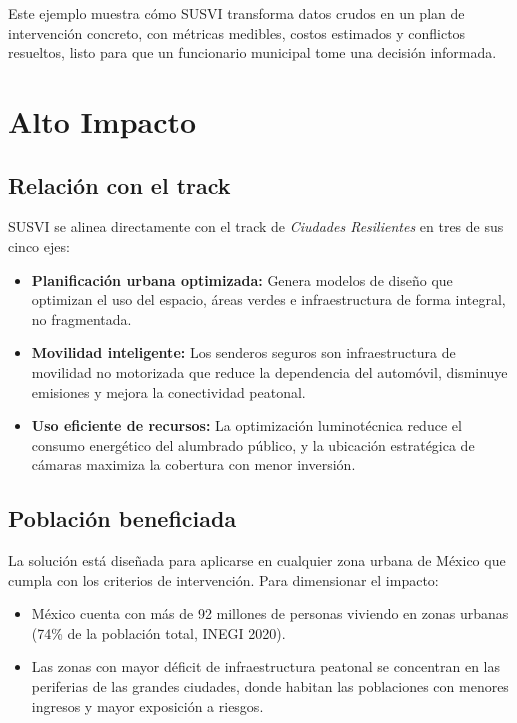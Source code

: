 \documentclass[12pt,a4paper]{article}
\begin{document}
Este ejemplo muestra cómo SUSVI transforma datos crudos en un plan de intervención concreto, con métricas medibles, costos estimados y conflictos resueltos, listo para que un funcionario municipal tome una decisión informada.


\section{Alto Impacto}

\subsection{Relación con el track}

SUSVI se alinea directamente con el track de \textit{Ciudades Resilientes} en tres de sus cinco ejes:

\begin{itemize}[leftmargin=1.5cm]
    \item \textbf{Planificación urbana optimizada:} Genera modelos de diseño que optimizan el uso del espacio, áreas verdes e infraestructura de forma integral, no fragmentada.
    \item \textbf{Movilidad inteligente:} Los senderos seguros son infraestructura de movilidad no motorizada que reduce la dependencia del automóvil, disminuye emisiones y mejora la conectividad peatonal.
    \item \textbf{Uso eficiente de recursos:} La optimización luminotécnica reduce el consumo energético del alumbrado público, y la ubicación estratégica de cámaras maximiza la cobertura con menor inversión.
\end{itemize}

\subsection{Población beneficiada}

La solución está diseñada para aplicarse en cualquier zona urbana de México que cumpla con los criterios de intervención. Para dimensionar el impacto:

\begin{itemize}[leftmargin=1.5cm]
    \item México cuenta con más de 92 millones de personas viviendo en zonas urbanas (74\% de la población total, INEGI 2020).
    \item Las zonas con mayor déficit de infraestructura peatonal se concentran en las periferias de las grandes ciudades, donde habitan las poblaciones con menores ingresos y mayor exposición a riesgos.
\end{itemize}
\end{document}
